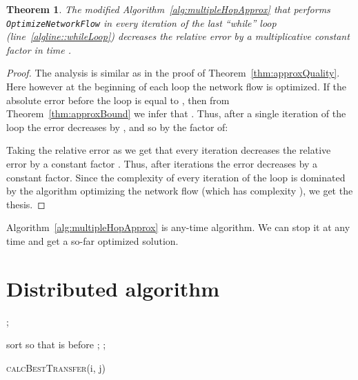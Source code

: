\documentclass[11pt]{article}
\newtheorem{theorem}{Theorem}
\begin{document}
\begin{theorem}
The modified Algorithm~\ref{alg:multipleHopApprox} that performs \texttt{OptimizeNetworkFlow} in every iteration of the last ``while'' loop (line~\ref{algline::whileLoop}) decreases the relative error  by a multiplicative constant factor in time .
\end{theorem}
\begin{proof}
The analysis is similar as in the proof of Theorem~\ref{thm:approxQuality}. Here however at the beginning of each loop the network flow is optimized. If the absolute error before the loop is equal to , then from Theorem~\ref{thm:approxBound} we infer that . Thus, after a single iteration of the loop the error decreases by , and so by the factor of:

Taking the relative error  as  we get that every iteration decreases the relative error by a constant factor .
Thus, after  iterations the error decreases by a constant factor. Since the complexity of every iteration of the loop is dominated by the algorithm optimizing the network flow (which has complexity ), we get the thesis.
\end{proof}

Algorithm~\ref{alg:multipleHopApprox} is any-time algorithm. We can stop it at any time and get a so-far optimized solution.














\section{Distributed algorithm}\label{sec:distr-algor}

\begin{algorithm}[t!]
  \ForEach{}{
       ; \; 
  }
   ;  \;

    sort  so that    is before \;
  {
       \;
       \;
      \If{}
      {
         ;  \;
         ;  \;
      }
  }
  \caption{\textsc{calcBestTransfer}(i, j)}
  \label{alg:exchangingLoads}
\end{algorithm}
\end{document}
